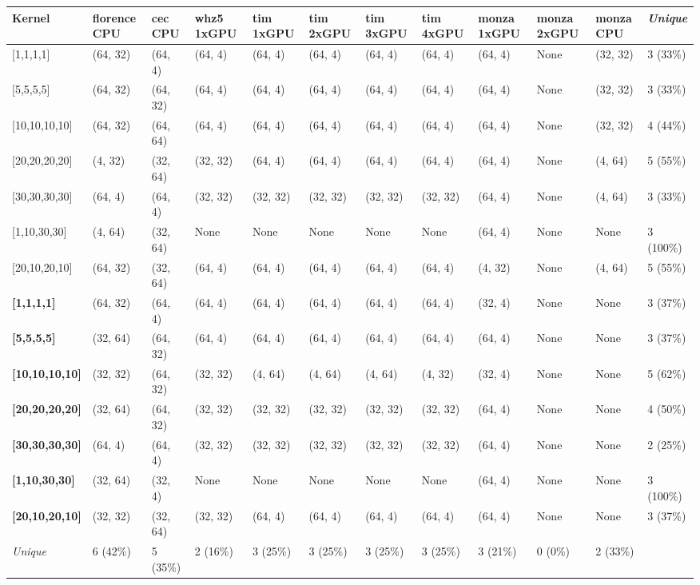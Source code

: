 \begin{tabular}{|p{1.8cm} | p{1cm} | p{1cm} | p{1cm} | p{1cm} | p{1cm} | p{1cm} | p{1cm} | p{1cm} | p{1cm} | p{1cm} | p{1.1cm}|}
\hline
\textbf{Kernel} & \textbf{florence CPU} & \textbf{cec CPU} & \textbf{whz5 1xGPU} & \textbf{tim 1xGPU} & \textbf{tim 2xGPU} & \textbf{tim 3xGPU} & \textbf{tim 4xGPU} & \textbf{monza 1xGPU} & \textbf{monza 2xGPU} & \textbf{monza CPU} & \textit{Unique}\\
\hline
{[}1,1,1,1{]} & (64, 32) & (64, 4) & (64, 4) & (64, 4) & (64, 4) & (64, 4) & (64, 4) & (64, 4) & None & (32, 32) & 3 (33\%)\\
{[}5,5,5,5{]} & (64, 32) & (64, 32) & (64, 4) & (64, 4) & (64, 4) & (64, 4) & (64, 4) & (64, 4) & None & (32, 32) & 3 (33\%)\\
{[}10,10,10,10{]} & (64, 32) & (64, 64) & (64, 4) & (64, 4) & (64, 4) & (64, 4) & (64, 4) & (64, 4) & None & (32, 32) & 4 (44\%)\\
{[}20,20,20,20{]} & (4, 32) & (32, 64) & (32, 32) & (64, 4) & (64, 4) & (64, 4) & (64, 4) & (64, 4) & None & (4, 64) & 5 (55\%)\\
{[}30,30,30,30{]} & (64, 4) & (64, 4) & (32, 32) & (32, 32) & (32, 32) & (32, 32) & (32, 32) & (64, 4) & None & (4, 64) & 3 (33\%)\\
{[}1,10,30,30{]} & (4, 64) & (32, 64) & None & None & None & None & None & (64, 4) & None & None & 3 (100\%)\\
{[}20,10,20,10{]} & (64, 32) & (32, 64) & (64, 4) & (64, 4) & (64, 4) & (64, 4) & (64, 4) & (4, 32) & None & (4, 64) & 5 (55\%)\\
\textbf{{[}1,1,1,1{]}} & (64, 32) & (64, 4) & (64, 4) & (64, 4) & (64, 4) & (64, 4) & (64, 4) & (32, 4) & None & None & 3 (37\%)\\
\textbf{{[}5,5,5,5{]}} & (32, 64) & (64, 32) & (64, 4) & (64, 4) & (64, 4) & (64, 4) & (64, 4) & (64, 4) & None & None & 3 (37\%)\\
\textbf{{[}10,10,10,10{]}} & (32, 32) & (64, 32) & (32, 32) & (4, 64) & (4, 64) & (4, 64) & (4, 32) & (32, 4) & None & None & 5 (62\%)\\
\textbf{{[}20,20,20,20{]}} & (32, 64) & (64, 32) & (32, 32) & (32, 32) & (32, 32) & (32, 32) & (32, 32) & (64, 4) & None & None & 4 (50\%)\\
\textbf{{[}30,30,30,30{]}} & (64, 4) & (64, 4) & (32, 32) & (32, 32) & (32, 32) & (32, 32) & (32, 32) & (64, 4) & None & None & 2 (25\%)\\
\textbf{{[}1,10,30,30{]}} & (32, 64) & (32, 4) & None & None & None & None & None & (64, 4) & None & None & 3 (100\%)\\
\textbf{{[}20,10,20,10{]}} & (32, 32) & (32, 64) & (32, 32) & (64, 4) & (64, 4) & (64, 4) & (64, 4) & (64, 4) & None & None & 3 (37\%)\\
\hline
\textit{Unique} & 6 (42\%) & 5 (35\%) & 2 (16\%) & 3 (25\%) & 3 (25\%) & 3 (25\%) & 3 (25\%) & 3 (21\%) & 0 (0\%) & 2 (33\%) & \\
\hline
\end{tabular}
